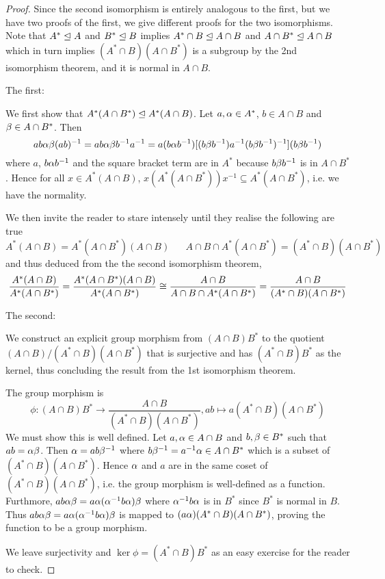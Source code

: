 \documentclass[../../book.tex]{subfiles}
\begin{document}
\begin{proof}
    
    Since the second isomorphism is entirely analogous to the first,
    but we have two proofs of the first,
    we give different proofs for the two isomorphisms.
    Note that $A^* \trianglelefteq A$ and $B^* \trianglelefteq B$
    implies $A^* \cap B \trianglelefteq A \cap B$ and $A \cap B^* \trianglelefteq A \cap B$
    which in turn implies $(A^* \cap B)(A \cap B^*)$ is a subgroup
    by the 2nd isomorphism theorem,
    and it is normal in $A \cap B$. 
    
    The first:
    
    We first show that $A^* (A \cap B^*) \trianglelefteq A^* (A \cap B)$. 
    Let $a, \alpha \in A^*$, $b \in A \cap B$ and $\beta \in A \cap B^*$. 
    Then \[
        ab \alpha\beta (ab)^{-1} = ab \alpha\beta b^{-1}a^{-1}
        = a (b\alpha b^{-1}) 
        [ (b\beta b^{-1}) a^{-1} (b\beta b^{-1})^{-1} ]
        (b\beta b^{-1})
    \]
    where $a$, $b\alpha b^{-1}$ and the square bracket term are in $A^*$
    because $b\beta b^{-1}$ is in $A \cap B^*$.
    Hence for all $x \in A^* (A \cap B)$, 
    $x (A^* (A \cap B^*)) x^{-1} \subseteq A^* (A \cap B^*)$,
    i.e. we have the normality. 
    
    We then invite the reader to stare intensely
    until they realise the following are true \[
        A^* (A \cap B) = A^* (A \cap B^*) (A \cap B) \,\,\,\,\,\,\,\,\,\,
        A \cap B \cap A^* (A \cap B^*) = (A^* \cap B)(A \cap B^*)
    \]
    and thus deduced from the the second isomorphism theorem, \[
        \frac {A^* (A \cap B)}{A^* (A \cap B^*)}
        = \frac {A^* (A \cap B^*)(A \cap B)}{A^* (A \cap B^*)}
        \cong \frac{A \cap B}{A \cap B \cap A^*(A \cap B^*) }
        = \frac{A \cap B}{(A^* \cap B)(A \cap B^*)}
    \]
    
    The second:
    
    We construct an explicit group morphism 
    from $(A \cap B)B^*$ to the quotient $(A \cap B) / (A^* \cap B)(A \cap B^*)$
    that is surjective and has $(A^* \cap B)B^*$ as the kernel,
    thus concluding the result from the 1st isomorphism theorem. 
    
    The group morphism is \[
        \phi : (A \cap B)B^* \to \frac{A \cap B}{(A^* \cap B)(A \cap B^*)},
        a b \mapsto a (A^* \cap B)(A \cap B^*)
    \]
    We must show this is well defined.
    Let $a, \alpha \in A \cap B$ and $b, \beta \in B^*$ such that $ab = \alpha \beta$. 
    Then $\alpha = a b \beta^{-1}$ where $b \beta^{-1} = a^{-1} \alpha \in A \cap B^*$
    which is a subset of $(A^* \cap B)(A \cap B^*)$.
    Hence $\alpha$ and $a$ are in the same coset of $(A^* \cap B)(A \cap B^*)$,
    i.e. the group morphism is well-defined as a function. 
    Furthmore, $a b \alpha \beta = a \alpha (\alpha^{-1} b \alpha) \beta$ 
    where $\alpha^{-1} b \alpha$ is in $B^*$ since $B^*$ is normal in $B$.
    Thus $a b \alpha \beta = a \alpha (\alpha^{-1} b \alpha) \beta$ is mapped to 
    $(a \alpha)(A^* \cap B)(A \cap B^*)$,
    proving the function to be a group morphism. 
    
    We leave surjectivity and $\ker \phi = (A^* \cap B) B^*$ 
    as an easy exercise for the reader to check. 
    
\end{proof}
\end{document}
